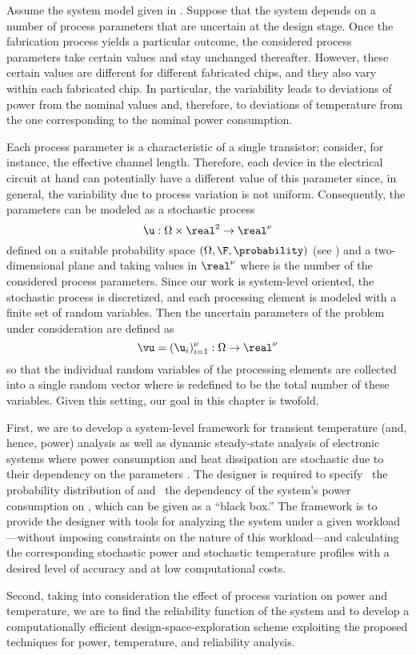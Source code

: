 Assume the system model given in . Suppose that the system
depends on a number of process parameters that are uncertain at the design
stage. Once the fabrication process yields a particular outcome, the considered
process parameters take certain values and stay unchanged thereafter. However,
these certain values are different for different fabricated chips, and they also
vary within each fabricated chip. In particular, the variability leads to
deviations of power from the nominal values and, therefore, to deviations of
temperature from the one corresponding to the nominal power consumption.

Each process parameter is a characteristic of a single transistor; consider, for
instance, the effective channel length. Therefore, each device in the electrical
circuit at hand can potentially have a different value of this parameter since,
in general, the variability due to process variation is not uniform.
Consequently, the parameters can be modeled as a stochastic process
\[
  \u: \Omega \times \real^2 \to \real^\nu
\]
defined on a suitable probability space $(\Omega, \F, \probability)$ (see
) and a two-dimensional plane and taking values in
$\real^\nu$ where \nu is the number of the considered process parameters. Since
our work is system-level oriented, the stochastic process is discretized, and
each processing element is modeled with a finite set of random variables. Then
the uncertain parameters of the problem under consideration are defined as
\[
  \vu = (\u_i)_{i = 1}^\nu: \Omega \to \real^\nu
\]
so that the individual random variables of the processing elements are collected
into a single random vector where \nu is redefined to be the total number of
these variables. Given this setting, our goal in this chapter is twofold.

First, we are to develop a system-level framework for transient temperature
(and, hence, power) analysis as well as dynamic steady-state analysis of
electronic systems where power consumption and heat dissipation are stochastic
due to their dependency on the parameters \vu. The designer is required to
specify \one~the probability distribution of \vu and \two~the dependency of the
system's power consumption on \vu, which can be given as a ``black box.'' The
framework is to provide the designer with tools for analyzing the system under a
given workload---without imposing constraints on the nature of this
workload---and calculating the corresponding stochastic power \mp and stochastic
temperature \mq profiles with a desired level of accuracy and at low
computational costs.

Second, taking into consideration the effect of process variation on power and
temperature, we are to find the reliability function of the system and to
develop a computationally efficient design-space-exploration scheme exploiting
the proposed techniques for power, temperature, and reliability analysis.
